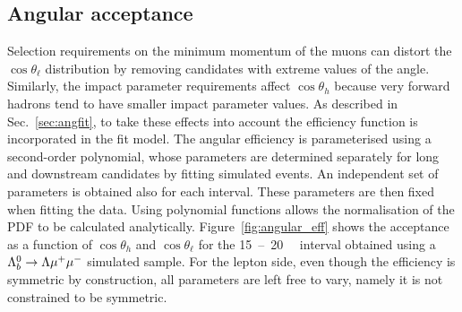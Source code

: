 

\subsection{Angular acceptance}
\label{sec:AngEff}

Selection requirements on the minimum momentum of the muons can distort the $\cos\theta_\ell$ 
distribution by removing candidates with extreme values of the angle. Similarly, 
the impact parameter requirements affect $\cos\theta_h$ because very forward hadrons tend
to have smaller impact parameter values. 
As described in Sec.~\ref{sec:angfit}, to take these effects into account the efficiency function is incorporated in the 
fit model. The angular efficiency is parameterised using a second-order polynomial, whose parameters 
are determined separately for long and downstream candidates by fitting simulated events. An independent 
set of parameters is obtained also for each \qsq interval. These parameters are then fixed when fitting the data.
Using polynomial functions allows the normalisation of the PDF to be calculated analytically.
Figure~\ref{fig:angular_eff} shows the acceptance as a function of $\cos\theta_h$ and 
$\cos\theta_\ell$ for the \mbox{15 -- 20~\gevgevcccc~\qsq} interval obtained using a $\Lambda^0_b\rightarrow\Lambda\mu^+\mu^-$ simulated sample.
%
For the lepton side, even though the efficiency is symmetric by construction,
all parameters are left free to vary, namely it is not constrained to be symmetric.


